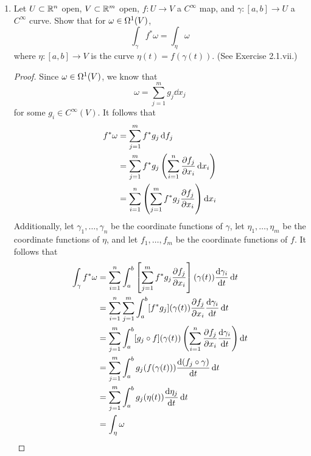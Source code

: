 \documentclass[../psets.tex]{subfiles}
\begin{document}
\begin{enumerate}[label={\textbf{2.6.\roman*.}}]
\begin{enumerate}
\begin{proof}
        \end{proof}
    \end{enumerate}
    \item Let $U\subset\R^n$ open, $V\subset\R^m$ open, $f:U\to V$ a $C^\infty$ map, and $\gamma:[a,b]\to U$ a $C^\infty$ curve. Show that for $\omega\in\ome[1]{V}$,
    \begin{equation*}
        \int_\gamma f^*\omega = \int_{\eta}\omega
    \end{equation*}
    where $\eta:[a,b]\to V$ is the curve $\eta(t)=f(\gamma(t))$. (See Exercise 2.1.vii.)
    \begin{proof}
        Since $\omega\in\ome[1]{V}$, we know that
        \begin{equation*}
            \omega = \sum_{j=1}^mg_j\dd{x_j}
        \end{equation*}
        for some $g_i\in C^\infty(V)$. It follows that
        \begin{align*}
            f^*\omega &= \sum_{j=1}^mf^*g_j\dd{f_j}\\
            &= \sum_{j=1}^mf^*g_j\left( \sum_{i=1}^n\pdv{f_j}{x_i}\dd{x_i} \right)\\
            &= \sum_{i=1}^n\left( \sum_{j=1}^mf^*g_j\pdv{f_j}{x_i} \right)\dd{x_i}
        \end{align*}
        Additionally, let $\gamma_1,\dots,\gamma_n$ be the coordinate functions of $\gamma$, let $\eta_1,\dots,\eta_m$ be the coordinate functions of $\eta$, and let $f_1,\dots,f_m$ be the coordinate functions of $f$. It follows that
        \begin{align*}
            \int_\gamma f^*\omega &= \sum_{i=1}^n\int_a^b\left[ \sum_{j=1}^mf^*g_j\pdv{f_j}{x_i} \right](\gamma(t))\dv{\gamma_i}{t}\dd{t}\\
            &= \sum_{i=1}^n\sum_{j=1}^m\int_a^b[f^*g_j](\gamma(t))\pdv{f_j}{x_i}\dv{\gamma_i}{t}\dd{t}\\
            &= \sum_{j=1}^m\int_a^b[g_j\circ f](\gamma(t))\left( \sum_{i=1}^n\pdv{f_j}{x_i}\dv{\gamma_i}{t} \right)\dd{t}\\
            &= \sum_{j=1}^m\int_a^bg_j(f(\gamma(t)))\dv{(f_j\circ\gamma)}{t}\dd{t}\\
            &= \sum_{j=1}^m\int_a^bg_j(\eta(t))\dv{\eta_j}{t}\dd{t}\\
            &= \int_\eta\omega
        \end{align*}
    \end{proof}
\end{enumerate}
\end{document}
